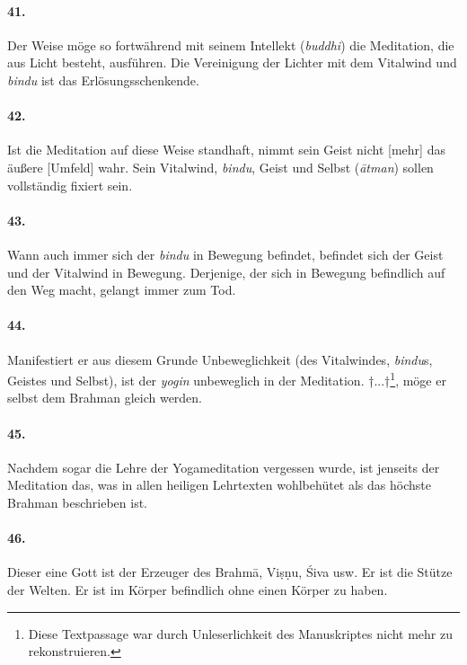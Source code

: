\documentclass[a4paper,12pt]{article}
\begin{document}
\paragraph{41.} Der Weise möge so fortwährend mit seinem Intellekt (\textit{buddhi}) die Meditation, die aus Licht besteht, ausführen. Die Vereinigung der Lichter mit dem Vitalwind und \textit{bindu} ist das Erlösungsschenkende.

\paragraph{42.} Ist die Meditation auf diese Weise standhaft, nimmt sein Geist nicht [mehr] das äußere [Umfeld] wahr. Sein Vitalwind, \textit{bindu}, Geist und Selbst (\textit{ātman}) sollen vollständig fixiert sein.


\paragraph{43.} Wann auch immer sich der \textit{bindu} in Bewegung befindet, befindet sich der Geist und der Vitalwind in Bewegung. Derjenige, der sich in Bewegung befindlich auf den Weg macht, gelangt immer zum Tod.

\paragraph{44.} Manifestiert er aus diesem Grunde Unbeweglichkeit (des Vitalwindes, \textit{bindu}s, Geistes und Selbst), ist der \textit{yogin} unbeweglich in der Meditation. †...†\footnote{Diese Textpassage war durch Unleserlichkeit des Manuskriptes nicht mehr zu rekonstruieren.}, möge er selbst dem Brahman gleich werden. 

\paragraph{45.} Nachdem sogar die Lehre der Yogameditation vergessen wurde, ist jenseits der Meditation das, was in allen heiligen Lehrtexten wohlbehütet als das höchste Brahman beschrieben ist.

\paragraph{46.} Dieser eine Gott ist der Erzeuger des Brahmā, Viṣṇu, Śiva usw. Er ist die Stütze der Welten. Er ist im Körper befindlich ohne einen Körper zu haben. 
\end{document}
